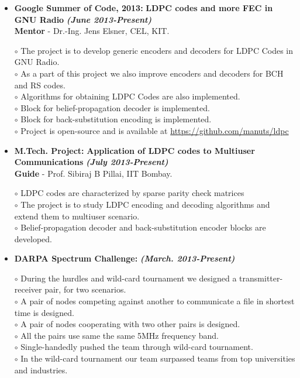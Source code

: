 \documentclass[a4paper,10pt]{article}
\begin{document}
 \begin{itemize}
 \setlength{\itemsep}{1pt}
 \item \textbf{Google Summer of Code, 2013:} \textbf{LDPC codes and more FEC in GNU Radio}  \textbf \emph{(June 2013-Present)}\\
        {\textbf{Mentor} - Dr.-Ing. Jens Elsner, CEL, KIT.   }          %

        $\circ$ The project is to develop generic encoders and decoders for LDPC Codes in GNU Radio. \\
        $\circ$ As a part of this project we also improve encoders and decoders for BCH and RS codes. \\
        $\circ$ Algorithms for obtaining LDPC Codes are also implemented. \\
        $\circ$ Block for belief-propagation decoder is implemented. \\
        $\circ$ Block for back-substitution encoding is implemented. \\
        $\circ$ Project is open-source and is available at \url{https://github.com/manuts/ldpc}

        \item \textbf{M.Tech. Project:} \textbf{Application of LDPC codes to Multiuser Communications} \textbf \emph{(July 2013-Present)} \\
        {\textbf{Guide} - Prof. Sibiraj B Pillai, IIT Bombay.}            %
        
$\circ$ LDPC codes are characterized by sparse parity check matrices \\ 
$\circ$ The project is to study LDPC encoding and decoding algorithms and extend them to multiuser scenario. \\
$\circ$ Belief-propagation decoder and back-substitution encoder blocks are developed.

        
\item \textbf{DARPA Spectrum Challenge:} \textbf \emph{(March. 2013-Present)}

$\circ$ During the hurdles and wild-card tournament we designed a transmitter-receiver pair, for two scenarios. \\
$\circ$ A pair of nodes competing against another to communicate a file in shortest time is designed. \\
$\circ$ A pair of nodes cooperating with two other pairs is designed. \\
$\circ$ All the pairs use same the same 5MHz frequency band. \\
$\circ$ Single-handedly pushed the team through wild-card tournament. \\
$\circ$ In the wild-card tournament our team surpassed teams from top universities and industries.
             

\end{itemize}
\end{document}

